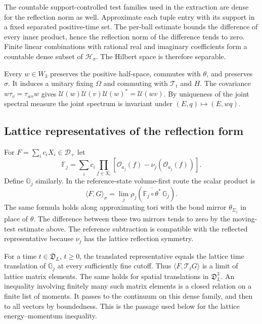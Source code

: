\documentclass[11pt,letterpaper,reqno]{amsart}
\theoremstyle{definition}
\theoremstyle{remark}
\newcommand{\cO}{\mathcal O}
\begin{document}
The countable support-controlled test families used in the extraction
are dense for the reflection norm as well. Approximate each tuple
entry with its support in a fixed separated positive-time set. The
per-ball estimate bounds the difference of every inner product, hence
the reflection norm of the difference tends to zero. Finite linear
combinations with rational real and imaginary coefficients form a
countable dense subset of $\mathcal H_\sigma$. The Hilbert space is
therefore separable.

Every $w\in W_3$ preserves the positive half-space, commutes with
$\theta$, and preserves $\sigma$. It induces a unitary fixing
$\Omega$ and commuting with $\mathcal T_t$ and $H$. The covariance
$w\tau_v=\tau_{wv}w$ gives
$\mathcal U(w)\mathcal U(v)\mathcal U(w)^*=\mathcal U(wv)$.
By uniqueness of the joint spectral measure the joint spectrum is
invariant under $(E,q)\mapsto(E,wq)$.

\subsection{Lattice representatives of the reflection form}

For $F=\sum_ic_iX_i\in\mathcal D_+$ let
\[
 \mathbb F_j=\sum_ic_i\prod_{f\in X_i}
                         [\cO_{a_j}(f)-\nu_j(\cO_{a_j}(f))].
\]
Define $\mathbb G_j$ similarly. In the reference-state volume-first
route the scalar product is
\begin{equation}\label{eq:lattice-reflection-limit}
 \langle F,G\rangle_\sigma
      =\lim_j\rho_j\left(
          \overline{\mathbb F_j\circ\theta^*}\,\mathbb G_j\right).
\end{equation}
The same formula holds along approximating tori with the bond mirror
$\theta_{\Sigma_j}$ in place of $\theta$. The difference between
these two mirrors tends to zero by the moving-test estimate above.
The reference subtraction is compatible with the reflected
representative because $\nu_j$ has the lattice reflection symmetry.

For a time $t\in\mathfrak D_L$, $t\ge0$, the translated
representative equals the lattice time translation of $\mathbb G_j$
at every sufficiently fine cutoff. Thus
$\langle F,\mathcal T_tG\rangle$ is a limit of lattice matrix
elements. The same holds for spatial translations in
$\mathfrak D_L^3$. An inequality involving finitely many such
matrix elements is a closed relation on a finite list of moments.
It passes to the continuum on this dense family, and then to all
vectors by boundedness. This is the passage used below for the
lattice energy--momentum inequality.
\end{document}
